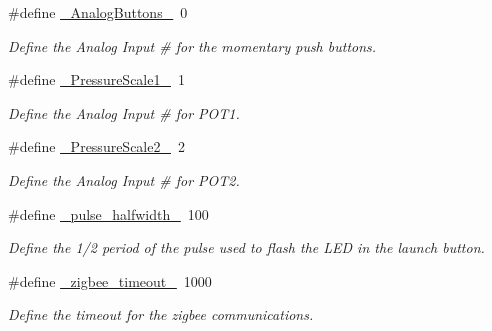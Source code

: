 \begin{DoxyCompactItemize}
\#define \hyperlink{masterPanel_8ino_a150478a9ca6eefa513c0a36f788bf8bd}{\+\_\+\+Analog\+Buttons\+\_\+}~0
\begin{DoxyCompactList}\small\item\em Define the Analog Input \# for the momentary push buttons. \end{DoxyCompactList}\item 
\#define \hyperlink{masterPanel_8ino_a088d470fd122b482dc087029b21f1f75}{\+\_\+\+Pressure\+Scale1\+\_\+}~1
\begin{DoxyCompactList}\small\item\em Define the Analog Input \# for P\+O\+T1. \end{DoxyCompactList}\item 
\#define \hyperlink{masterPanel_8ino_acef1a33ec0ad5ae6ca07e04f9d64fd2f}{\+\_\+\+Pressure\+Scale2\+\_\+}~2
\begin{DoxyCompactList}\small\item\em Define the Analog Input \# for P\+O\+T2. \end{DoxyCompactList}\item 
\#define \hyperlink{masterPanel_8ino_a9a8dc8e6e75e845a90d783b02b6be855}{\+\_\+pulse\+\_\+halfwidth\+\_\+}~100
\begin{DoxyCompactList}\small\item\em Define the 1/2 period of the pulse used to flash the L\+ED in the launch button. \end{DoxyCompactList}\item 
\#define \hyperlink{masterPanel_8ino_a6b982ea9a4c912acbfd98bbd5072e258}{\+\_\+zigbee\+\_\+timeout\+\_\+}~1000
\begin{DoxyCompactList}\small\item\em Define the timeout for the zigbee communications. \end{DoxyCompactList}\end{DoxyCompactItemize}
